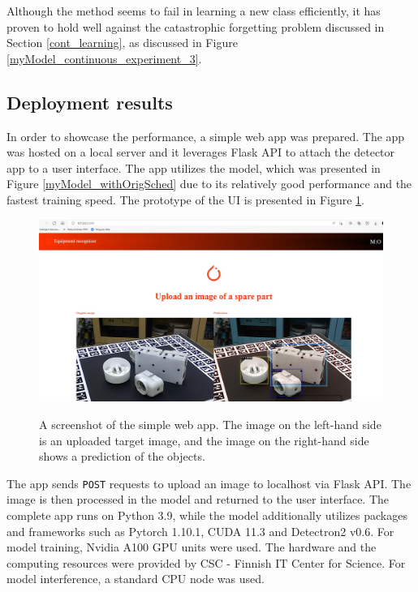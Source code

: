Although the method seems to fail in learning a new class efficiently, it has proven to hold well against the catastrophic forgetting problem discussed in Section \ref{cont_learning}, as discussed in Figure \ref{myModel_continuous_experiment_3}. 

\subsection{Deployment results}
In order to showcase the performance, a simple web app was prepared. The app was hosted on a local server and it leverages Flask API to attach the detector app to a user interface. The app utilizes the model, which was presented in Figure \ref{myModel_withOrigSched} due to its relatively good performance and the fastest training speed. The prototype of the UI is presented in Figure \ref{demo}. 

\begin{figure}[htb]
	\begin{center}
		\includegraphics[width=14cm]{./demo.png}
	\end{center}
	\caption{A screenshot of the simple web app. The image on the left-hand side is an uploaded target image, and the image on the right-hand side shows a prediction of the objects.}
	\begin{center}
		\label{demo}
	\end{center}
\end{figure}

The app sends \texttt{POST} requests to upload an image to localhost via Flask API. The image is then processed in the model and returned to the user interface. The complete app runs on Python 3.9, while the model additionally utilizes packages and frameworks such as Pytorch 1.10.1, CUDA 11.3 and Detectron2 v0.6. For model training, Nvidia A100 GPU units were used. The hardware and the computing resources were provided by CSC - Finnish IT Center for Science. For model interference, a standard CPU node was used. 

\clearpage